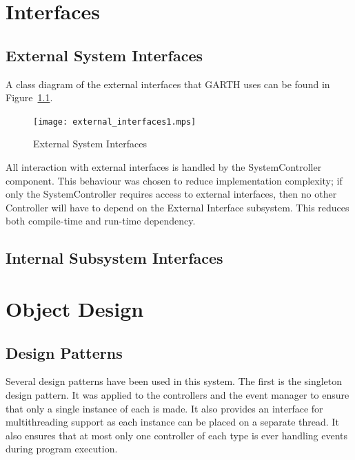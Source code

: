 \documentclass{report}
\begin{document}
\chapter{Interfaces} %
\label{ch:interfaces}

\section{External System Interfaces}

A class diagram of the external interfaces that GARTH uses can be found in
Figure~\ref{fig:external_interfaces}.

\begin{figure}[hp]
    \centering
        \caption{External System Interfaces}
        \scriptsize
        \setlength{\unitlength}{2.0em}
        \texttt{[image: external\_interfaces1.mps]}
        \normalsize
    \label{fig:external_interfaces}
\end{figure}

All interaction with external interfaces is handled by the SystemController
component. This behaviour was chosen to reduce implementation complexity; if
only the SystemController requires access to external interfaces, then no other
Controller will have to depend on the External Interface subsystem.  This
reduces both compile-time and run-time dependency.

\section{Internal Subsystem Interfaces}



\chapter{Object Design} %
\label{ch:object-design}


\section{Design Patterns}

Several design patterns have been used in this system. The first is the
singleton design pattern. It was applied to the controllers and the event
manager to ensure that only a single instance of each is made. It also provides
an interface for multithreading support as each instance can be placed on a
separate thread. It also ensures that at most only one controller of each type
is ever handling events during program execution.
\end{document}
